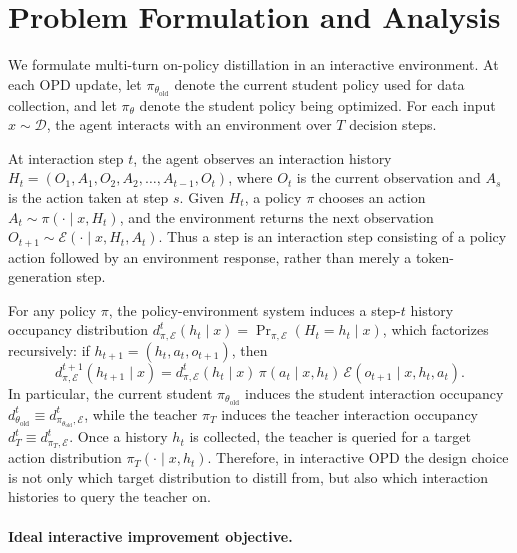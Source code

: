 \section{Problem Formulation and Analysis}
\label{sec:formulation}

We formulate multi-turn on-policy distillation in an interactive environment.
At each OPD update, let \(\pi_{\theta_{\mathrm{old}}}\) denote the current
student policy used for data collection, and let \(\pi_\theta\) denote the
student policy being optimized. For each input \(x\sim\mathcal D\), the agent
interacts with an environment over \(T\) decision steps.

At interaction step \(t\), the agent observes an interaction history
\(H_t=(O_1,A_1,O_2,A_2,\ldots,A_{t-1},O_t)\), where \(O_t\) is the current
observation and \(A_s\) is the action taken at step \(s\). Given \(H_t\), a policy
\(\pi\) chooses an action \(A_t\sim\pi(\cdot\mid x,H_t)\), and the environment returns
the next observation \(O_{t+1}\sim\mathcal E(\cdot\mid x,H_t,A_t)\). Thus a step is an
interaction step consisting of a policy action followed by an environment response,
rather than merely a token-generation step.

For any policy \(\pi\), the policy-environment system induces a step-\(t\) history
occupancy distribution
\(d_{\pi,\mathcal E}^{t}(h_t\mid x)=\Pr_{\pi,\mathcal E}(H_t=h_t\mid x)\), which
factorizes recursively: if \(h_{t+1}=(h_t,a_t,o_{t+1})\), then
\[
d_{\pi,\mathcal E}^{t+1}(h_{t+1}\mid x)
=
d_{\pi,\mathcal E}^{t}(h_t\mid x)\,
\pi(a_t\mid x,h_t)\,
\mathcal E(o_{t+1}\mid x,h_t,a_t).
\]
In particular, the current student \(\pi_{\theta_{\mathrm{old}}}\) induces the
student interaction occupancy
\(d_{\theta_{\mathrm{old}}}^{t}\equiv d_{\pi_{\theta_{\mathrm{old}}},\mathcal E}^{t}\),
while the teacher \(\pi_T\) induces the teacher interaction occupancy
\(d_T^{t}\equiv d_{\pi_T,\mathcal E}^{t}\). Once a history \(h_t\) is collected, the
teacher is queried for a target action distribution \(\pi_T(\cdot\mid x,h_t)\).
Therefore, in interactive OPD the design choice is not only which target
distribution to distill from, but also which interaction histories to query the
teacher on.

\paragraph{Ideal interactive improvement objective.}

